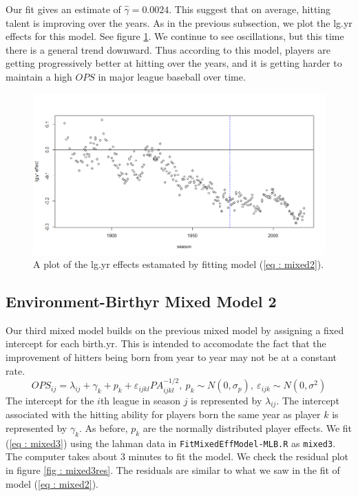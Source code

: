 \documentclass [52pt] {article}
\begin{document}
Our fit gives an estimate of $\hat{\gamma} = 0.0024$.  This suggest that on average, hitting talent is improving over the years.  As in the previous subsection, we plot the lg.yr effects for this model.  See figure \ref{fig : lg.yr_effs_mixed2}.  We continue to see oscillations, but this time there is a general trend downward.  Thus according to this model, players are getting progressively better at hitting over the years, and it is getting harder to maintain a high $OPS$ in major league baseball over time.
\begin{figure}[h!]
\centering
\includegraphics[scale = 0.5]{lg.yr_effs_mixed2.png}
\caption{\label{fig : lg.yr_effs_mixed2} A plot of the lg.yr effects estamated by fitting model (\ref{eq : mixed2}).}
\end{figure}

\subsection{Environment-Birthyr Mixed Model 2}
Our third mixed model builds on the previous mixed model by assigning a fixed intercept for each birth.yr.  This is intended to accomodate the fact that the improvement of hitters being born from year to year may not be at a constant rate.
\begin{equation}\label{eq : mixed3}
OPS_{ij} = \lambda_{ij} + \gamma_k +  p_k + \varepsilon_{ijkl} PA_{ijkl}^{-1/2},\:p_k\sim N(0,\sigma_p),\: \varepsilon_{ijk}\sim N(0,\sigma^2)
\end{equation}
The intercept for the $i$th league in season $j$ is represented by $\lambda_{ij}$.  The intercept associated with the hitting ability for players born the same year as player $k$ is represented by $\gamma_k$.  As before, $p_k$ are the normally distributed player effects.  We fit (\ref{eq : mixed3}) using the lahman data in \verb|FitMixedEffModel-MLB.R| as \verb|mixed3|.  The computer takes about 3 minutes to fit the model.  We check the residual plot in figure \ref{fig : mixed3res}.  The residuals are similar to what we saw in the fit of model (\ref{eq : mixed2}).
\end{document}
